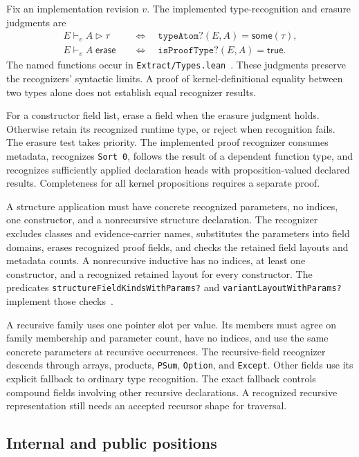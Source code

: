\documentclass[11pt]{article}
\newcommand{\code}[1]{\texttt{#1}}
\newcommand{\some}{\mathsf{some}}
\newcommand{\rep}{\mathrel{\triangleright}}
\begin{document}
Fix an implementation revision $v$.  The implemented type-recognition and erasure judgments are
\begin{align*}
E\vdash_v A\rep\tau
&\quad\Longleftrightarrow\quad
\code{typeAtom?}(E,A)=\some(\tau),\\
E\vdash_v A\;\mathsf{erase}
&\quad\Longleftrightarrow\quad
\code{isProofType?}(E,A)=\mathsf{true}.
\end{align*}
The named functions occur in \code{Extract/Types.lean}~\cite{types}.  These judgments preserve the recognizers' syntactic limits.  A proof of kernel-definitional equality between two types alone does not establish equal recognizer results.

For a constructor field list, erase a field when the erasure judgment holds.  Otherwise retain its recognized runtime type, or reject when recognition fails.  The erasure test takes priority.  The implemented proof recognizer consumes metadata, recognizes \code{Sort 0}, follows the result of a dependent function type, and recognizes sufficiently applied declaration heads with proposition-valued declared results.  Completeness for all kernel propositions requires a separate proof.

A structure application must have concrete recognized parameters, no indices, one constructor, and a nonrecursive structure declaration.  The recognizer excludes classes and evidence-carrier names, substitutes the parameters into field domains, erases recognized proof fields, and checks the retained field layouts and metadata counts.  A nonrecursive inductive has no indices, at least one constructor, and a recognized retained layout for every constructor.  The predicates \code{structureFieldKindsWithParams?} and \code{variantLayoutWithParams?} implement those checks~\cite{types}.

A recursive family uses one pointer slot per value.  Its members must agree on family membership and parameter count, have no indices, and use the same concrete parameters at recursive occurrences.  The recursive-field recognizer descends through arrays, products, \code{PSum}, \code{Option}, and \code{Except}.  Other fields use its explicit fallback to ordinary type recognition.  The exact fallback controls compound fields involving other recursive declarations.  A recognized recursive representation still needs an accepted recursor shape for traversal.

\subsection{Internal and public positions}
\end{document}
